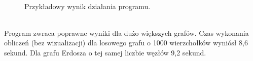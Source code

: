 \documentclass{article}
\begin{document}
        \begin{figure}[h!]
            \centering
            \\
            \caption{Przykładowy wynik działania programu.}
        \end{figure}\\
        \FloatBarrier
        Program zwraca poprawne wyniki dla dużo większych grafów. Czas wykonania obliczeń (bez wizualizacji) dla losowego grafu o 1000 wierzchołków wyniósł 8,6 sekund. Dla grafu Erdosza o tej samej liczbie węzłów 9,2 sekund. 
\end{document}
